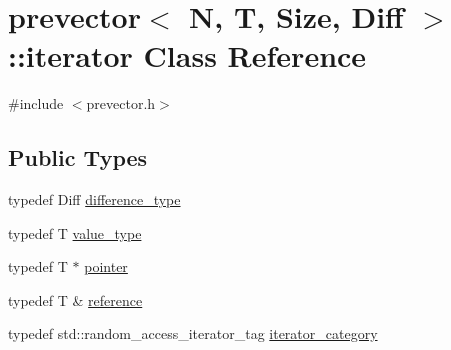 \hypertarget{classprevector_1_1iterator}{}\section{prevector$<$ N, T, Size, Diff $>$\+:\+:iterator Class Reference}
\label{classprevector_1_1iterator}


{\ttfamily \#include $<$prevector.\+h$>$}

\subsection*{Public Types}
\begin{DoxyCompactItemize}
\item 
typedef Diff \mbox{\hyperlink{classprevector_1_1iterator_a9540618843eb1657d30f7890d04ee6f0}{difference\+\_\+type}}
\item 
typedef T \mbox{\hyperlink{classprevector_1_1iterator_a4ed27e1ffe40f9402eafa1b25d52acc6}{value\+\_\+type}}
\item 
typedef T $\ast$ \mbox{\hyperlink{classprevector_1_1iterator_af25d07eb9d72ffc3f3b302c5f8de62c3}{pointer}}
\item 
typedef T \& \mbox{\hyperlink{classprevector_1_1iterator_a6341636ac7a5106273407aa3531cb7d4}{reference}}
\item 
typedef std\+::random\+\_\+access\+\_\+iterator\+\_\+tag \mbox{\hyperlink{classprevector_1_1iterator_accf46d24c818422d68e6ea3ea60305f8}{iterator\+\_\+category}}
\end{DoxyCompactItemize}
